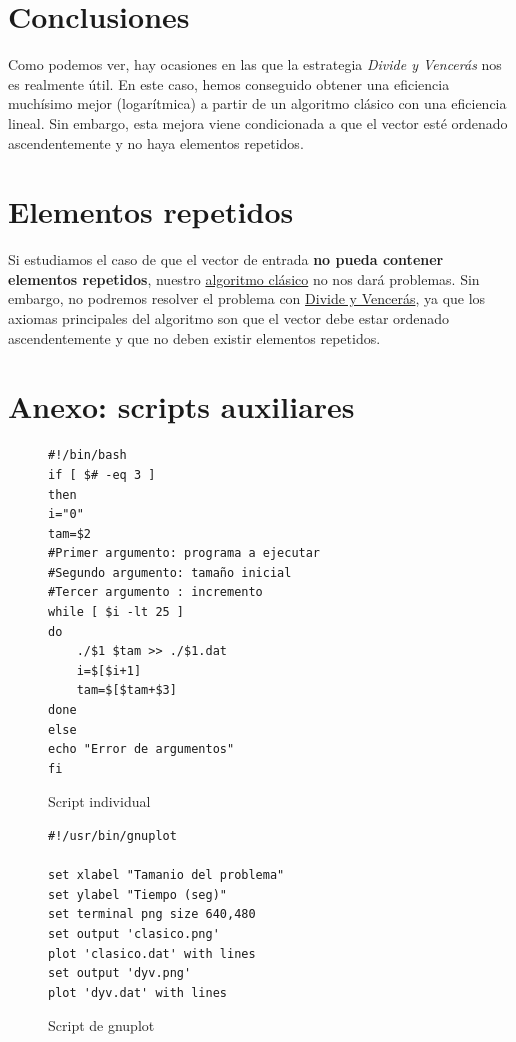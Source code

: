 \documentclass[12pt,spanish]{article}
\begin{document}
\newpage

\section{Conclusiones}

Como podemos ver, hay ocasiones en las que la estrategia \emph{Divide y Vencerás} nos es realmente útil. En este caso, hemos conseguido obtener una eficiencia muchísimo mejor (logarítmica) a partir de un algoritmo clásico con una eficiencia lineal. Sin embargo, esta mejora viene condicionada a que el vector esté ordenado ascendentemente y no haya elementos repetidos.

\section{Elementos repetidos}

Si estudiamos el caso de que el vector de entrada \textbf{no pueda contener elementos repetidos}, nuestro \textcolor{blue!60}{\hyperref[alg:clasico]{algoritmo clásico}} no nos dará problemas. Sin embargo, no podremos resolver el problema con \textcolor{blue!60}{\hyperref[alg:dyv]{Divide y Vencerás}}, ya que los axiomas principales del algoritmo son que el vector debe estar ordenado ascendentemente y que no deben existir elementos repetidos.


\newpage

\section{Anexo: scripts auxiliares}
\label{sec:scripts}

\begin{figure}[H]
\begin{verbatim}
#!/bin/bash
if [ $# -eq 3 ]
then
i="0"
tam=$2
#Primer argumento: programa a ejecutar
#Segundo argumento: tamaño inicial
#Tercer argumento : incremento
while [ $i -lt 25 ]
do
	./$1 $tam >> ./$1.dat
	i=$[$i+1]
	tam=$[$tam+$3]
done
else
echo "Error de argumentos"
fi

\end{verbatim}
\caption{Script individual}
\end{figure}



\begin{figure}[H]
\begin{verbatim}
#!/usr/bin/gnuplot

set xlabel "Tamanio del problema"
set ylabel "Tiempo (seg)"
set terminal png size 640,480
set output 'clasico.png'
plot 'clasico.dat' with lines
set output 'dyv.png'
plot 'dyv.dat' with lines
\end{verbatim}
\caption{Script de gnuplot}
\end{figure}
\end{document}
